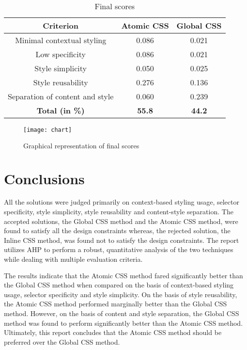 \documentclass[12pt]{article}
\begin{document}
\begin{table}[h]
	\centering
	\begin{tabular}{|c|c|c|}
		\hline
		\textbf{Criterion} & \textbf{Atomic CSS} & \textbf{Global CSS} \\ 
		\hline
		Minimal contextual styling & 0.086 & 0.021 \\
		\hline 
		Low specificity & 0.086 & 0.021 \\
		\hline
		Style simplicity & 0.050 & 0.025 \\
		\hline
		Style reusability & 0.276 & 0.136 \\
		\hline
		Separation of content and style & 0.060 & 0.239 \\
		\hline
		\textbf{Total (in \%)} & \textbf{55.8} & \textbf{44.2} \\
		\hline
	\end{tabular}
	\caption{Final scores}
\end{table}

\vspace{0.5cm}

\begin{figure}[h]
\texttt{[image: chart]}
\centering
\caption{Graphical representation of final scores}
\end{figure}

\vspace{0.5cm}

\newpage

\section{Conclusions}
All the solutions were judged primarily on context-based styling usage, selector specificity, style simplicity, style reusability and content-style separation. The accepted solutions, the Global CSS method and the Atomic CSS method, were found to satisfy all the design constraints whereas, the rejected solution, the Inline CSS method, was found not to satisfy the design constraints. The report utilizes AHP to perform a robust, quantitative analysis of the two techniques while dealing with multiple evaluation criteria.

The results indicate that the Atomic CSS method fared significantly better than the Global CSS method when compared on the basis of context-based styling usage, selector specificity and style simplicity. On the basis of style reusability, the Atomic CSS method performed marginally better than the Global CSS method. However, on the basis of content and style separation, the Global CSS method was found to perform significantly better than the Atomic CSS method. Ultimately, this report concludes that the Atomic CSS method should be preferred over the Global CSS method.
\end{document}
